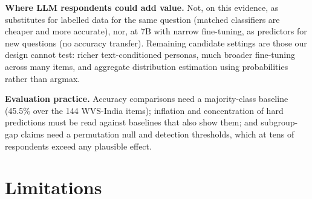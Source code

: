 \documentclass[conference]{IEEEtran}
\begin{document}
\textbf{Where LLM respondents could add value.} Not, on this evidence, as substitutes for labelled data for the same question (matched classifiers are cheaper and more accurate), nor, at 7B with narrow fine-tuning, as predictors for new questions (no accuracy transfer). Remaining candidate settings are those our design cannot test: richer text-conditioned personas, much broader fine-tuning across many items, and aggregate distribution estimation using probabilities rather than argmax.

\textbf{Evaluation practice.} Accuracy comparisons need a majority-class baseline (45.5\% over the 144 WVS-India items); inflation and concentration of hard predictions must be read against baselines that also show them; and subgroup-gap claims need a permutation null and detection thresholds, which at tens of respondents exceed any plausible effect.

\section{Limitations}
\end{document}
